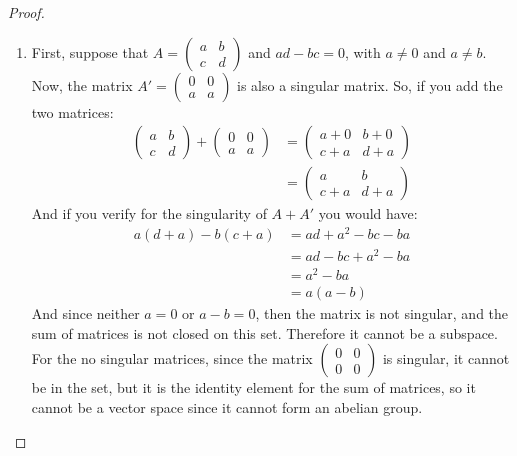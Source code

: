 \documentclass{tufte-handout}
\begin{document}
\begin{proof}
\begin{enumerate}
		\item First, suppose that $A = \begin{pmatrix}
			a & b\\ c& d
		\end{pmatrix}$ and $ad - bc = 0$, with $a \neq 0$ and $a \neq b$. Now, the matrix $A' = \begin{pmatrix}
			0 & 0\\ a & a
		\end{pmatrix}$ is also a singular matrix. So, if you add the two matrices:
		\begin{align*}
			\begin{pmatrix}
				a & b\\ c& d
			\end{pmatrix} + \begin{pmatrix}
				0 & 0\\ a & a
			\end{pmatrix} &= \begin{pmatrix}
				a + 0 & b + 0\\ c + a & d + a
			\end{pmatrix}\\
			&= \begin{pmatrix}
				a & b \\ c +a & d + a
			\end{pmatrix}
		\end{align*}
		And if you verify for the singularity of $A + A'$ you would have:
		\begin{align*}
			a(d +a) - b(c+a) &= ad + a^2 - bc - ba\\
			&= ad - bc + a^2 - ba\\
			&= a^2 - ba\\
			&= a(a - b)
		\end{align*}
		And since neither $a = 0$ or $a-b = 0$, then the matrix is not singular, and the sum of matrices is not closed on this set. Therefore it cannot be a subspace. For the no singular matrices, since the matrix $\begin{pmatrix}
			0 & 0\\ 0 & 0
		\end{pmatrix}$ is singular, it cannot be in the set, but it is the identity element for the sum of matrices, so it cannot be a vector space since it cannot form an abelian group.
	\end{enumerate}
\end{proof}
\end{document}
